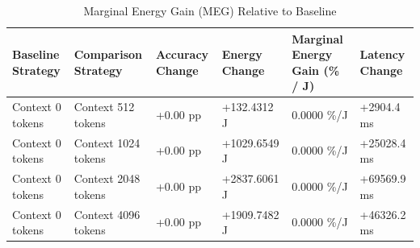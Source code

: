 \begin{table}
\caption{Marginal Energy Gain (MEG) Relative to Baseline}
\label{tab:marginal_energy_gain}
\begin{tabular}{llllll}
\toprule
Baseline Strategy & Comparison Strategy & Accuracy Change & Energy Change & Marginal Energy Gain (\% / J) & Latency Change \\
\midrule
Context 0 tokens & Context 512 tokens & +0.00 pp & +132.4312 J & 0.0000 \%/J & +2904.4 ms \\
Context 0 tokens & Context 1024 tokens & +0.00 pp & +1029.6549 J & 0.0000 \%/J & +25028.4 ms \\
Context 0 tokens & Context 2048 tokens & +0.00 pp & +2837.6061 J & 0.0000 \%/J & +69569.9 ms \\
Context 0 tokens & Context 4096 tokens & +0.00 pp & +1909.7482 J & 0.0000 \%/J & +46326.2 ms \\
\bottomrule
\end{tabular}
\end{table}
